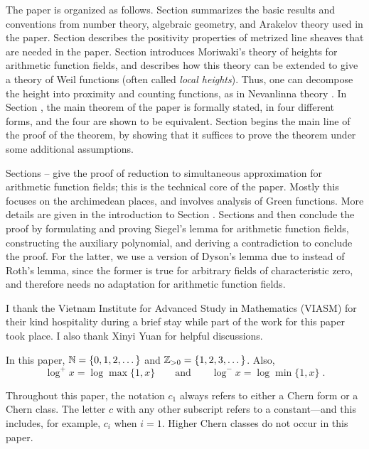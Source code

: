 The paper is organized as follows.  Section  summarizes the basic
results and conventions from number theory, algebraic geometry, and
Arakelov theory used in the paper.  Section  describes the positivity
properties of metrized line sheaves that are needed in the paper.
Section  introduces Moriwaki's theory of heights for arithmetic
function fields, and describes how this theory can be extended to give
a theory of Weil functions (often called {\it local heights\/}).
Thus, one can decompose the height into
proximity and counting functions, as in Nevanlinna theory \citep{voj11}.
In Section , the main theorem of the paper is formally stated, in four
different forms, and the four are shown to be equivalent.
Section  begins the main line of the proof of the theorem, by showing that
it suffices to prove the theorem under some additional assumptions.

Sections -- give the proof of reduction to simultaneous approximation
for arithmetic function fields; this is the technical core of the paper.
Mostly this focuses on the archimedean places, and involves analysis
of Green functions.  More details are given in the introduction to Section .
Sections  and  then conclude the proof by formulating and proving
Siegel's lemma for arithmetic function fields, constructing the auxiliary
polynomial, and deriving a contradiction to conclude the proof.
For the latter, we use a version of Dyson's lemma \citep{dyson47} due to
\citet{ev84} instead of Roth's lemma, since the former
is true for arbitrary fields of characteristic zero, and therefore needs no
adaptation for arithmetic function fields.

I thank the Vietnam Institute for Advanced Study in Mathematics (VIASM) for
their kind hospitality during a brief stay while part of the work for this
paper took place.  I also thank Xinyi Yuan for helpful discussions.


In this paper, $\Bbb N=\{0,1,2,\dots\}$ and $\Bbb Z_{>0}=\{1,2,3,\dots\}$.
Also,
$$\log^{+} x = \log\max\{1, x\}
  \qquad\text{and}\qquad
  \log^{-} x = \log\min\{1, x\}\;.$$

Throughout this paper, the notation $c_1$ always refers to either
a Chern form or a Chern class.  The letter $c$ with any other subscript
refers to a constant---and this includes, for example, $c_i$ when $i=1$.
Higher Chern classes do not occur in this paper.


